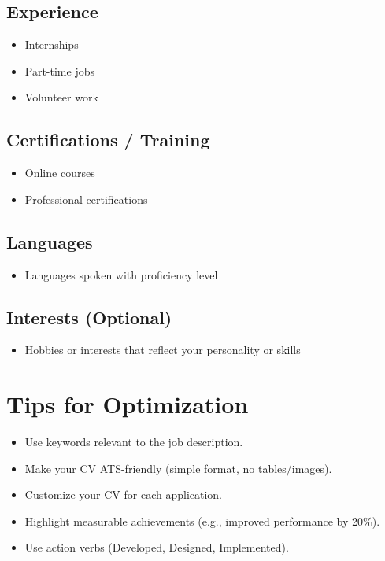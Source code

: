 \documentclass[11pt,a4paper]{article}
\begin{document}
\subsection{Experience}
\begin{itemize}
    \item Internships
    \item Part-time jobs
    \item Volunteer work
\end{itemize}

\subsection{Certifications / Training}
\begin{itemize}
    \item Online courses
    \item Professional certifications
\end{itemize}

\subsection{Languages}
\begin{itemize}
    \item Languages spoken with proficiency level
\end{itemize}

\subsection{Interests (Optional)}
\begin{itemize}
    \item Hobbies or interests that reflect your personality or skills
\end{itemize}

\section{Tips for Optimization}

\begin{itemize}
    \item Use keywords relevant to the job description.
    \item Make your CV ATS-friendly (simple format, no tables/images).
    \item Customize your CV for each application.
    \item Highlight measurable achievements (e.g., improved performance by 20\%).
    \item Use action verbs (Developed, Designed, Implemented).
\end{itemize}
\end{document}

